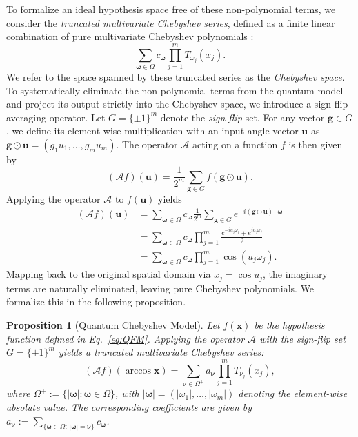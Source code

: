 \documentclass[%
 reprint,
 amsmath,amssymb,
 aps,
 pra,
]{revtex4-2}
\newtheorem{proposition}[theorem]{Proposition}
\theoremstyle{definition}
\begin{document}
To formalize an ideal hypothesis space free of these non-polynomial terms, we consider the \emph{truncated multivariate Chebyshev series}, defined as a finite linear combination of pure multivariate Chebyshev polynomials \cite{Trefethen2017}:
\begin{equation}
\sum_{\boldsymbol{\omega} \in \Omega} c_{\boldsymbol{\omega}} \prod_{j=1}^m T_{\omega_j}(x_j).
\end{equation}
We refer to the space spanned by these truncated series as the \emph{Chebyshev space}. To systematically eliminate the non-polynomial terms from the quantum model and project its output strictly into the Chebyshev space, we introduce a sign-flip averaging operator. Let \(G=\{\pm1\}^m\) denote the \textit{sign-flip} set. For any vector \(\boldsymbol{g} \in G\), we define its element-wise multiplication with an input angle vector \(\boldsymbol{u}\) as \(\boldsymbol{g} \odot \boldsymbol{u} = (g_1 u_1, \dots, g_m u_m)\). The operator \(\mathcal{A}\) acting on a function \(f\) is then given by
\begin{equation}
\label{eq:sign_avg}
(\mathcal{A}f)(\boldsymbol{u}) = \frac{1}{2^m} \sum_{\boldsymbol{g} \in G} f(\boldsymbol{g} \odot \boldsymbol{u}).
\end{equation}
Applying the operator \(\mathcal{A}\) to \(f(\boldsymbol{u})\) yields
\begin{align}
(\mathcal{A}f)(\boldsymbol{u})
&=\sum_{\boldsymbol{\omega}\in\Omega} c_{\boldsymbol{\omega}} \frac{1}{2^m} \sum_{\boldsymbol{g} \in G} e^{-i(\boldsymbol{g} \odot \boldsymbol{u}) \cdot \boldsymbol{\omega}}\\
&=\sum_{\boldsymbol{\omega}\in\Omega} c_{\boldsymbol{\omega}} \prod_{j=1}^m \frac{e^{-i u_j \omega_j}+e^{i u_j \omega_j}}{2}\\
&=\sum_{\boldsymbol{\omega}\in\Omega} c_{\boldsymbol{\omega}} \prod_{j=1}^m \cos \left(u_j \omega_j\right).
\end{align}
Mapping back to the original spatial domain via \(x_j = \cos u_j\), the imaginary terms are naturally eliminated, leaving pure Chebyshev polynomials. We formalize this in the following proposition.

\begin{proposition}[Quantum Chebyshev Model]
Let \(f(\bm{x})\) be the hypothesis function defined in Eq.~\eqref{eq:QFM}. Applying the operator \(\mathcal{A}\) with the sign-flip set \(G=\{\pm1\}^m\) yields a truncated multivariate Chebyshev series:
\begin{equation}
\label{eq:QCM}
(\mathcal{A}f)(\arccos \boldsymbol{x}) = \sum_{\boldsymbol{\nu}\in\Omega^{+}} a_{\boldsymbol{\nu}} \prod_{j=1}^m T_{\nu_j}(x_j),
\end{equation}
where \(\Omega^{+}:=\{|\boldsymbol{\omega}|:\boldsymbol{\omega}\in\Omega\}\), with \(|\boldsymbol{\omega}| = (|\omega_1|, \dots, |\omega_m|)\) denoting the element-wise absolute value. The corresponding coefficients are given by \(a_{\boldsymbol{\nu}}:=\sum_{\{\boldsymbol{\omega}\in\Omega:\,|\boldsymbol{\omega}|=\boldsymbol{\nu}\}} c_{\boldsymbol{\omega}}\).
\end{proposition}
\end{document}
